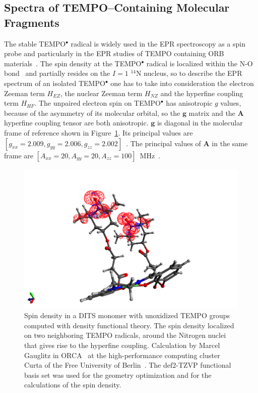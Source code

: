 \subsection{Spectra of TEMPO--Containing Molecular Fragments}
The stable TEMPO$^\bullet$ radical is widely used in the EPR spectroscopy as a spin probe and particularly in the EPR studies of TEMPO containing ORB materials~\cite{nakahara2002_cpl, nishide2004_electact, bahaceci2013_jpowersources, aydin2015_jsoistatelect, khodeir2019_softmatter, Zhang2018}. The spin density at the TEMPO$^\bullet$ radical is localized within the N-O bond~\cite{Owenius2001} and partially resides on the $I=1$ $^{14}$N nucleus, so to describe the EPR spectrum of an isolated TEMPO$^\bullet$ one has to take into consideration the electron Zeeman term $H_{EZ}$, the nuclear Zeeman term $H_{NZ}$ and the hyperfine coupling term $H_{HF}$. The unpaired electron spin on TEMPO$^\bullet$ has anisotropic $g$ values, because of the asymmetry of its molecular orbital, so the $\textbf{g}$ matrix and the $\textbf{A}$ hyperfine coupling tensor are both anisotropic. $\textbf{g}$ is diagonal in the molecular frame of reference shown in Figure~\ref{fig:TEMPO_dft}. Its principal values are $\left[g_{xx}=2.009,g_{yy}=2.006,g_{zz}=2.002\right]$~\cite{Liu_2008,Bordignon2017}. The principal values of $\textbf{A}$ in the same frame are $\left[A_{xx}=20,A_{yy}=20,A_{zz}=100\right]$~MHz~\cite{Liu_2008,Bordignon2017}.


\begin{figure}[h]
\center
	\includegraphics[width=1\textwidth]{./operando_epr/figures/DITS_DFT.pdf}
	\caption{Spin density in a DITS monomer with unoxidized TEMPO groups computed with density functional theory. The spin density localized on two neighboring TEMPO radicals, around the Nitrogen nuclei that gives rise to the hyperfine coupling. Calculation by Marcel Gauglitz in ORCA~\cite{Orca} at the high-performance computing cluster Curta of the Free University of Berlin~\cite{Curta}. The def2-TZVP functional basis set was used for the geometry optimization and for the calculations of the spin density.}
	\label{fig:TEMPO_dft}
\end{figure}



